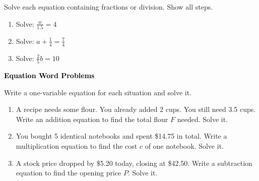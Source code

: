 \documentclass[12pt, letterpaper, fleqn]{article}
\begin{document}
\noindent
Solve each equation containing fractions or division. Show all steps.

\vspace{3mm}

\begin{enumerate}[itemsep=2.2cm, leftmargin=0.6cm]

\item Solve: $\frac{w}{1.5} = 4$

\vspace{2cm}

\item Solve: $a + \frac{1}{4} = \frac{7}{4}$

\vspace{2cm}

\item Solve: $\frac{2}{5}b = 10$

\vspace{2cm}

\end{enumerate}

\newpage

\begin{tcolorbox}[colback=black!10]
\large\textcolor{black}{\textbf{Equation Word Problems}}
\end{tcolorbox}

\noindent
Write a one-variable equation for each situation and solve it.

\vspace{3mm}

\begin{enumerate}[itemsep=2.2cm, leftmargin=0.6cm]

\item A recipe needs some flour. You already added 2 cups. You still need 3.5 cups. Write an addition equation to find the total flour $F$ needed. Solve it.

\vspace{2cm}

\item You bought 5 identical notebooks and spent \$14.75 in total. Write a multiplication equation to find the cost $c$ of one notebook. Solve it.

\vspace{2cm}

\item A stock price dropped by \$5.20 today, closing at \$42.50. Write a subtraction equation to find the opening price $P$. Solve it.

\vspace{2cm}

\end{enumerate}
\end{document}

